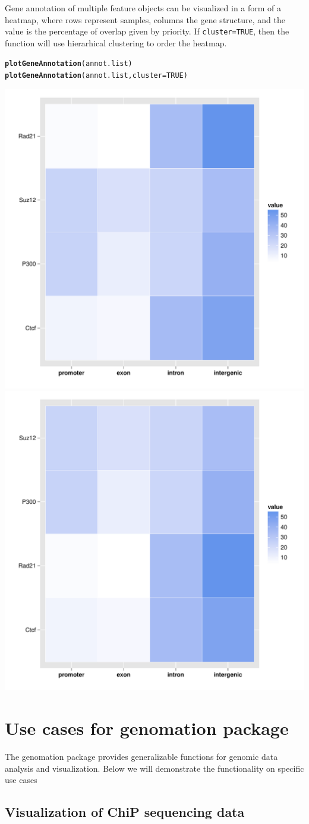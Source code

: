 \documentclass{article}\usepackage[]{graphicx}\usepackage[]{color}
\makeatletter
\newcommand{\hlnum}[1]{\textcolor[rgb]{0.686,0.059,0.569}{#1}}%
\newcommand{\hlstd}[1]{\textcolor[rgb]{0.345,0.345,0.345}{#1}}%
\newcommand{\hlkwc}[1]{\textcolor[rgb]{0.333,0.667,0.333}{#1}}%
\newcommand{\hlkwd}[1]{\textcolor[rgb]{0.737,0.353,0.396}{\textbf{#1}}}%
\newenvironment{kframe}{%
 \def\at@end@of@kframe{}%
 \ifinner\ifhmode%
  \def\at@end@of@kframe{\end{minipage}}%
  \begin{minipage}{\columnwidth}%
 \fi\fi%
 \def\FrameCommand##1{\hskip\@totalleftmargin \hskip-\fboxsep
 \colorbox{shadecolor}{##1}\hskip-\fboxsep
     \hskip-\linewidth \hskip-\@totalleftmargin \hskip\columnwidth}%
 \MakeFramed {\advance\hsize-\width
   \@totalleftmargin\z@ \linewidth\hsize
   \@setminipage}}%
 {\par\unskip\endMakeFramed%
 \at@end@of@kframe}
\newenvironment{knitrout}{}{} %
\newcommand{\Rcode}[1]{{\texttt{#1}}}
\makeatother
\begin{document}
Gene annotation of multiple feature objects can be visualized in a form of a heatmap, 
where rows represent samples, columns the gene structure, and the value is the 
percentage of overlap given by priority. If \Rcode{cluster=TRUE}, then the function
will use hierarhical clustering to order the heatmap.
\begin{knitrout}
\color{fgcolor}\begin{kframe}
\begin{alltt}
\hlkwd{plotGeneAnnotation}\hlstd{(annot.list)}
\hlkwd{plotGeneAnnotation}\hlstd{(annot.list,} \hlkwc{cluster} \hlstd{=} \hlnum{TRUE}\hlstd{)}
\end{alltt}
\end{kframe}

{\centering \includegraphics[width=.25\textwidth]{FiguresplotGeneAnnotation1} 
\includegraphics[width=.25\textwidth]{FiguresplotGeneAnnotation2} 

}



\end{knitrout}





\section{Use cases for genomation package}
The genomation package provides generalizable functions for genomic data analysis
and visualization. Below we will demonstrate the functionality on specific use cases



\subsection{Visualization of ChiP sequencing data}
\end{document}
